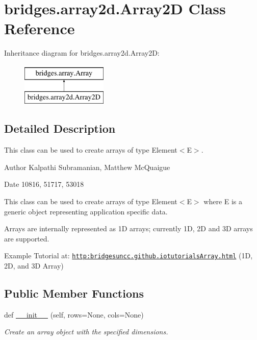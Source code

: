 \hypertarget{classbridges_1_1array2d_1_1_array2_d}{}\section{bridges.\+array2d.\+Array2D Class Reference}
\label{classbridges_1_1array2d_1_1_array2_d}
Inheritance diagram for bridges.\+array2d.\+Array2D\+:\begin{figure}[H]
\begin{center}
\leavevmode
\includegraphics[height=2.000000cm]{classbridges_1_1array2d_1_1_array2_d}
\end{center}
\end{figure}


\subsection{Detailed Description}
This class can be used to create arrays of type Element$<$\+E$>$. 

\begin{DoxyAuthor}{Author}
Kalpathi Subramanian, Matthew Mc\+Quaigue
\end{DoxyAuthor}
\begin{DoxyDate}{Date}
10816, 51717, 53018
\end{DoxyDate}
This class can be used to create arrays of type Element$<$\+E$>$ where E is a generic object representing application specific data.

Arrays are internally represented as 1D arrays; currently 1D, 2D and 3D arrays are supported.

Example Tutorial at\+: \href{http:bridgesuncc.github.iotutorialsArray.html}{\tt http\+:bridgesuncc.\+github.\+iotutorials\+Array.\+html} (1D, 2D, and 3D Array)~\newline
 \subsection*{Public Member Functions}
\begin{DoxyCompactItemize}
\item 
def \mbox{\hyperlink{classbridges_1_1array2d_1_1_array2_d_a8e55f66ed3e8b4f9dd0a6eac578d8c07}{\+\_\+\+\_\+init\+\_\+\+\_\+}} (self, rows=None, cols=None)
\begin{DoxyCompactList}\small\item\em Create an array object with the specified dimensions. \end{DoxyCompactList}\end{DoxyCompactItemize}
